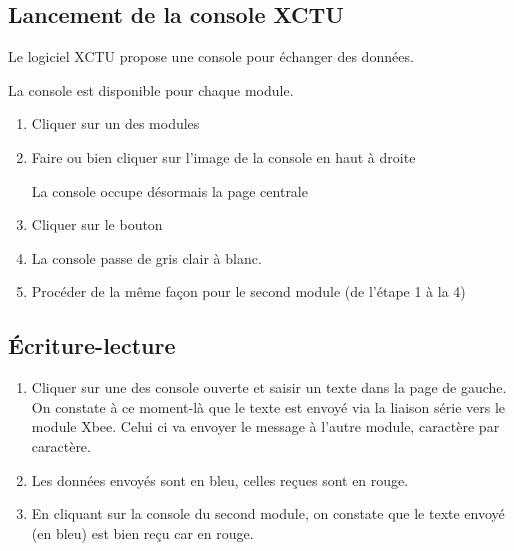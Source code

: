 {\subsection{Lancement de la console XCTU}

Le logiciel XCTU propose une console pour échanger des données.

La console est disponible pour chaque module.

\begin{enumerate}
    
    \item Cliquer sur un des modules

    \item Faire  ou bien cliquer sur l'image de la console en haut à droite



La console occupe désormais la page centrale 


\item Cliquer sur le bouton 


\item La console passe de gris clair à blanc. 

\item Procéder de la même façon pour le second module (de l'étape 1 à la 4)
\end{enumerate}
\subsection{Écriture-lecture}

\begin{enumerate}
    
    \item Cliquer sur une des console ouverte et saisir un texte dans la page de gauche.\\
    On constate à ce moment-là que le texte est envoyé via la liaison série vers le module Xbee. Celui ci va envoyer le message à l'autre module, caractère par caractère.


\item  Les données envoyés sont en bleu, celles reçues sont en rouge.

\item En cliquant sur la console du second module, on constate que le texte envoyé (en bleu) est bien reçu car en rouge.


\end{enumerate}}
